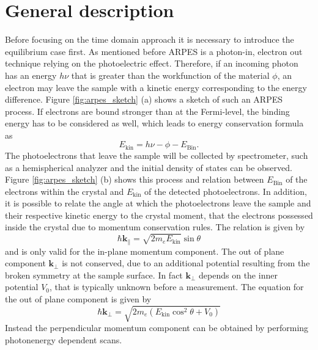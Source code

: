 \section{General description}

Before focusing on the time domain approach it is necessary to introduce the equilibrium case first.
As mentioned before ARPES is a photon-in, electron out technique relying on the photoelectric effect.
Therefore, if an incoming photon has an energy $h\nu$ that is greater than the workfunction of the material $\phi$, an electron may leave the sample with a kinetic energy corresponding to the energy difference.
Figure \ref{fig:arpes_sketch} (a) shows a sketch of such an ARPES process.
If electrons are bound stronger than at the Fermi-level, the binding energy has to be considered as well, which leads to energy conservation formula as
\begin{equation}
	E_\text{kin} = h\nu - \phi - E_\text{Bin}.
	\label{eq_e_cons}
\end{equation}
The photoelectrons that leave the sample will be collected by spectrometer, such as a hemispherical analyzer and the initial density of states can be observed.
Figure \ref{fig:arpes_sketch} (b) shows this process and relation between $E_\text{Bin}$ of the electrons within the crystal and $E_\text{kin}$ of the detected photoelectrons.
In addition, it is possible to relate the angle at which the photoelectrons leave the sample and their respective kinetic energy to the crystal moment, that the electrons possessed inside the crystal due to momentum conservation rules.
The relation is given by
\begin{equation}
	\hbar \mathbf{k}_\parallel = \sqrt{2m_eE_\text{kin}} \sin\theta
	\label{eq:mom}
\end{equation}
and is only valid for the in-plane momentum component.
The out of plane component $\mathbf{k}_\perp$ is not conserved, due to an additional potential resulting from the broken symmetry at the sample surface.
In fact $\mathbf{k}_\perp$ depends on the inner potential $V_0$, that is typically unknown before a measurement.
The equation for the out of plane component is given by
\begin{equation}
	\hbar \mathbf{k}_\perp = \sqrt{2m_e\left(E_\text{kin}\cos^2\theta+V_0\right)}
\end{equation}
Instead the perpendicular momentum component can be obtained by performing photonenergy dependent scans.
